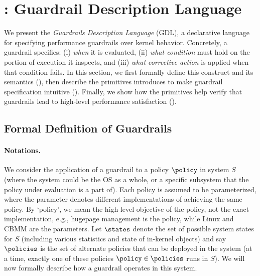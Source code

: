 \section{\lang: Guardrail Description Language}\label{sec:gdl}

We present the \emph{Guardrails Description Language} (GDL), a declarative language for specifying performance guardrails over kernel behavior.
Concretely, a guardrail specifies: (i) \emph{when} it is evaluated, (ii) \emph{what condition} must hold on the portion of execution it inspects, and (iii) \emph{what corrective action} is applied when that condition fails.
In this section, we first formally define this construct and its semantics (), then describe the primitives \lang introduces to make guardrail specification intuitive (). Finally, we show how the \lang primitives help verify that guardrails lead to high-level performance satisfaction ().  

\subsection{Formal Definition of Guardrails}
\label{subsec:formal-guardrails}

\paragraph{Notations.}
We consider the application of a guardrail to a policy $\policy$ in system $S$ (where the system could be the OS as a whole, or a specific subsystem that the policy under evaluation is a part of).
Each policy is assumed to be parameterized, where the parameter denotes different implementations of achieving the same policy. 
By `policy', we mean the high-level objective of the policy, not the exact implementation, e.g., hugepage management is the policy, while Linux and CBMM are the parameters. 
Let $\states$ denote the set of possible system states for $S$ (including various statistics and state of in-kernel objects) and say $\policies$ is the set of alternate policies that can be deployed in the system (at a time, exactly one of these policies $\policy \in \policies$ runs in $S$). We will now formally describe how a guardrail operates in this system.


